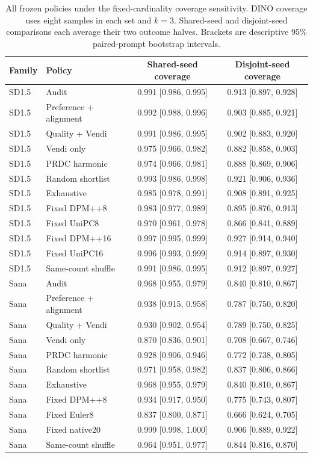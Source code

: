 \begin{table}[tp]
\centering\small
\caption{All frozen policies under the fixed-cardinality coverage sensitivity. DINO coverage uses eight samples in each set and $k=3$. Shared-seed and disjoint-seed comparisons each average their two outcome halves. Brackets are descriptive 95\% paired-prompt bootstrap intervals.}
\begin{tabular}{llcc}
\toprule Family & Policy & Shared-seed coverage & Disjoint-seed coverage \\ \midrule
SD1.5 & Audit & 0.991 [0.986, 0.995] & 0.913 [0.897, 0.928]\\
SD1.5 & Preference + alignment & 0.992 [0.988, 0.996] & 0.903 [0.885, 0.921]\\
SD1.5 & Quality + Vendi & 0.991 [0.986, 0.995] & 0.902 [0.883, 0.920]\\
SD1.5 & Vendi only & 0.975 [0.966, 0.982] & 0.882 [0.858, 0.903]\\
SD1.5 & PRDC harmonic & 0.974 [0.966, 0.981] & 0.888 [0.869, 0.906]\\
SD1.5 & Random shortlist & 0.993 [0.986, 0.998] & 0.921 [0.906, 0.936]\\
SD1.5 & Exhaustive & 0.985 [0.978, 0.991] & 0.908 [0.891, 0.925]\\
SD1.5 & Fixed DPM++8 & 0.983 [0.977, 0.989] & 0.895 [0.876, 0.913]\\
SD1.5 & Fixed UniPC8 & 0.970 [0.961, 0.978] & 0.866 [0.841, 0.889]\\
SD1.5 & Fixed DPM++16 & 0.997 [0.995, 0.999] & 0.927 [0.914, 0.940]\\
SD1.5 & Fixed UniPC16 & 0.996 [0.993, 0.999] & 0.914 [0.897, 0.930]\\
SD1.5 & Same-count shuffle & 0.991 [0.986, 0.995] & 0.912 [0.897, 0.927]\\
Sana & Audit & 0.968 [0.955, 0.979] & 0.840 [0.810, 0.867]\\
Sana & Preference + alignment & 0.938 [0.915, 0.958] & 0.787 [0.750, 0.820]\\
Sana & Quality + Vendi & 0.930 [0.902, 0.954] & 0.789 [0.750, 0.825]\\
Sana & Vendi only & 0.870 [0.836, 0.901] & 0.708 [0.667, 0.746]\\
Sana & PRDC harmonic & 0.928 [0.906, 0.946] & 0.772 [0.738, 0.805]\\
Sana & Random shortlist & 0.971 [0.958, 0.982] & 0.837 [0.806, 0.866]\\
Sana & Exhaustive & 0.968 [0.955, 0.979] & 0.840 [0.810, 0.867]\\
Sana & Fixed DPM++8 & 0.934 [0.917, 0.950] & 0.775 [0.743, 0.807]\\
Sana & Fixed Euler8 & 0.837 [0.800, 0.871] & 0.666 [0.624, 0.705]\\
Sana & Fixed native20 & 0.999 [0.998, 1.000] & 0.906 [0.889, 0.922]\\
Sana & Same-count shuffle & 0.964 [0.951, 0.977] & 0.844 [0.816, 0.870]\\
\bottomrule\end{tabular}
\end{table}
